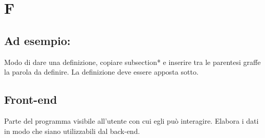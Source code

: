 \section*{F}
\markright{}
\subsection*{Ad esempio:}
Modo di dare una definizione, copiare subsection*{} e inserire tra le parentesi graffe la parola da definire. La definizione deve essere apposta sotto.
\subsection*{Front-end}
Parte del programma visibile all'utente con cui egli può interagire. Elabora i dati in modo che siano utilizzabili dal back-end.

